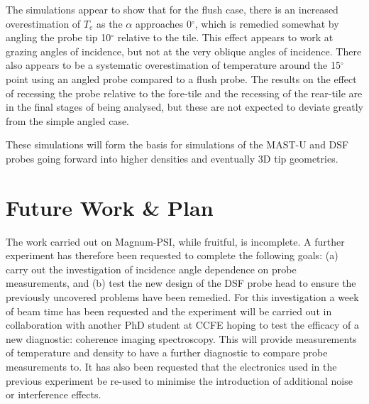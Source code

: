\documentclass[a4paper, 12pt]{article} %
\begin{document}
	The simulations appear to show that for the flush case, there is an increased overestimation of $T_e$ as the $\alpha$ approaches 0$^{\circ}$, which is remedied somewhat by angling the probe tip 10$^{\circ}$ relative to the tile. 
	This effect appears to work at grazing angles of incidence, but not at the very oblique angles of incidence.
	There also appears to be a systematic overestimation of temperature around the 15$^{\circ}$ point using an angled probe compared to a flush probe. 
	The results on the effect of recessing the probe relative to the fore-tile and the recessing of the rear-tile are in the final stages of being analysed, but these are not expected to deviate greatly from the simple angled case.
	
    These simulations will form the basis for simulations of the MAST-U and DSF probes going forward into higher densities and eventually 3D tip geometries. 


\section{\label{sec:phd}Future Work \& Plan}

	The work carried out on Magnum-PSI, while fruitful, is incomplete.
	A further experiment has therefore been requested to complete the following goals: (a) carry out the investigation of incidence angle dependence on probe measurements, and (b) test the new design of the DSF probe head to ensure the previously uncovered problems have been remedied.
	For this investigation a week of beam time has been requested and the experiment will be carried out in collaboration with another PhD student at CCFE hoping to test the efficacy of a new diagnostic: coherence imaging spectroscopy.
	This will provide measurements of temperature and density to have a further diagnostic to compare probe measurements to. 
	It has also been requested that the electronics used in the previous experiment be re-used to minimise the introduction of additional noise or interference effects.
\end{document}
